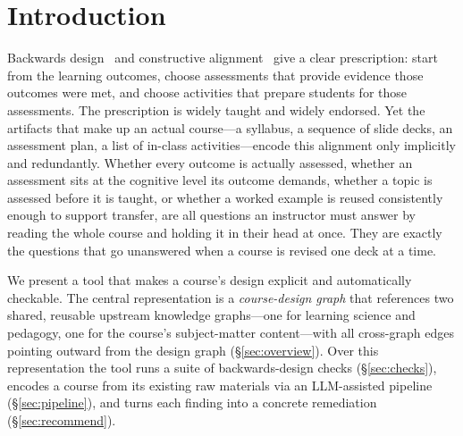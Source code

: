 \documentclass[sigconf,review]{acmart}
\begin{document}

\maketitle

\section{Introduction}
\label{sec:intro}

Backwards design~\cite{wiggins2005understanding,tyler1949basic} and constructive
alignment~\cite{biggs1996constructive} give a clear prescription: start from the
learning outcomes, choose assessments that provide evidence those outcomes were
met, and choose activities that prepare students for those assessments. The
prescription is widely taught and widely endorsed. Yet the artifacts that make up
an actual course---a syllabus, a sequence of slide decks, an assessment plan, a
list of in-class activities---encode this alignment only implicitly and
redundantly. Whether every outcome is actually assessed, whether an assessment
sits at the cognitive level its outcome demands, whether a topic is assessed
before it is taught, or whether a worked example is reused consistently enough to
support transfer, are all questions an instructor must answer by reading the
whole course and holding it in their head at once. They are exactly the questions
that go unanswered when a course is revised one deck at a time.


We present a tool that makes a course's design explicit and automatically
checkable. The central representation is a \emph{course-design graph} that
references two shared, reusable upstream knowledge graphs---one for learning
science and pedagogy, one for the course's subject-matter content---with all
cross-graph edges pointing outward from the design graph
(\S\ref{sec:overview}). Over this representation the tool runs a suite of
backwards-design checks (\S\ref{sec:checks}), encodes a course from its existing
raw materials via an LLM-assisted pipeline (\S\ref{sec:pipeline}), and turns each
finding into a concrete remediation (\S\ref{sec:recommend}).
\end{document}

